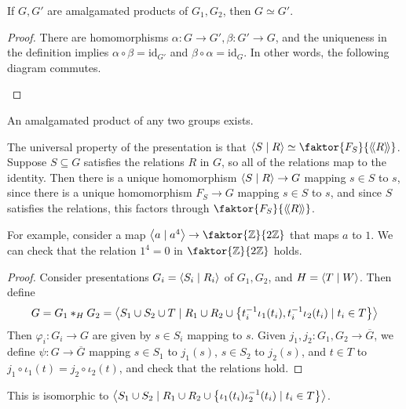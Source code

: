 \begin{proposition}
	If \( G, G' \) are amalgamated products of \( G_1, G_2 \), then \( G \simeq G' \).
\end{proposition}
\begin{proof}
	There are homomorphisms \( \alpha \colon G \to G', \beta \colon G' \to G \), and the uniqueness in the definition implies \( \alpha \circ \beta = \mathrm{id}_{G'} \) and \( \beta \circ \alpha = \mathrm{id}_G \).
	In other words, the following diagram commutes.
	\begin{center}
	\end{center}
\end{proof}
\begin{proposition}
	An amalgamated product of any two groups exists.
\end{proposition}
The universal property of the presentation is that \( \genset{S \mid R} \simeq \faktor{F_S}{\ngenset{R}} \).
Suppose \( S \subseteq G \) satisfies the relations \( R \) in \( G \), so all of the relations map to the identity.
Then there is a unique homomorphism \( \left\langle{} S \mid R \right\rangle \to G \) mapping \( s \in S \) to \( s \), since there is a unique homomorphism \( F_S \to G \) mapping \( s \in S \) to \( s \), and since \( S \) satisfies the relations, this factors through \( \faktor{F_S}{\ngenset{R}} \).

For example, consider a map \( \genset{a \mid a^4} \to \faktor{\mathbb Z}{2\mathbb Z} \) that maps \( a \) to \( 1 \).
We can check that the relation \( 1^4 = 0 \) in \( \faktor{\mathbb Z}{2\mathbb Z} \) holds.
\begin{proof}
	Consider presentations \( G_i = \left\langle{} S_i \mid R_i \right\rangle \) of \( G_1, G_2 \), and \( H = \left\langle{} T \mid W \right\rangle \).
	Then define
	\[ G = G_1 \ast_H G_2 = \left\langle{} S_1 \cup S_2 \cup T \mid R_1 \cup R_2 \cup \qty{t_i^{-1}\iota_1(t_i), t_i^{-1}\iota_2(t_i) \mid t_i \in T} \right\rangle \]
	Then \( \varphi_i \colon G_i \to G \) are given by \( s \in S_i \) mapping to \( s \).
	Given \( j_1, j_2 \colon G_1, G_2 \to \overline G \), we define \( \psi \colon G \to \overline G \) mapping \( s \in S_1 \) to \( j_1(s) \), \( s \in S_2 \) to \( j_2(s) \), and \( t \in T \) to \( j_1 \circ \iota_1(t) = j_2 \circ \iota_2(t) \), and check that the relations hold.
\end{proof}
This is isomorphic to \( \left\langle{} S_1 \cup S_2 \mid R_1 \cup R_2 \cup \qty{\iota_1(t_i) \iota_2^{-1}(t_i) \mid t_i \in T} \right\rangle \).

